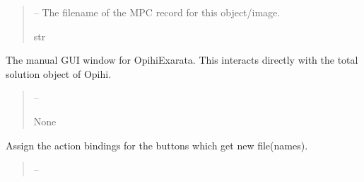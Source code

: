 \documentclass[letterpaper,11pt,english]{sphinxmanual}
\begin{document}
\begin{savenotes}
\begin{fulllineitems}
\begin{savenotes}
\begin{fulllineitems}
\begin{quote}
\begin{description}
\sphinxAtStartPar
{} – The filename of the MPC record for this object/image.

\sphinxAtStartPar
str

\end{description}\end{quote}

\end{fulllineitems}\end{savenotes}


\begin{savenotes}\begin{fulllineitems}
\label{\detokenize{code/opihiexarata.gui.manual:opihiexarata.gui.manual.OpihiManualWindow.__init__}}
\pysigstartsignatures
{}
\pysigstopsignatures
\sphinxAtStartPar
The manual GUI window for OpihiExarata. This interacts directly
with the total solution object of Opihi.
\begin{quote}\begin{description}
\sphinxAtStartPar
{} – 

\sphinxAtStartPar
None

\end{description}\end{quote}

\end{fulllineitems}\end{savenotes}


\begin{savenotes}\begin{fulllineitems}
\label{\detokenize{code/opihiexarata.gui.manual:opihiexarata.gui.manual.OpihiManualWindow.__init_gui_connections}}
\pysigstartsignatures
{}
\pysigstopsignatures
\sphinxAtStartPar
Assign the action bindings for the buttons which get new
file(names).
\begin{quote}\begin{description}
\sphinxAtStartPar
{} – 


\end{description}
\end{quote}
\end{fulllineitems}
\end{savenotes}
\end{fulllineitems}
\end{savenotes}
\end{document}
